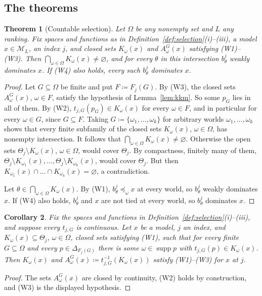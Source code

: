 \documentclass[11pt]{article}
\newtheorem{theorem}{Theorem}[section]
\newtheorem{corollary}[theorem]{Corollary}
\theoremstyle{definition}
\theoremstyle{remark}
\newcommand{\M}{\mathcal M}
\newcommand{\supp}{\operatorname{supp}}
\begin{document}
\subsection{The theorems}

\begin{theorem}[Countable selection]\label{thm:general}
Let $\Omega$ be any nonempty set and $L$ any ranking. Fix spaces and functions as in Definition~\ref{def:selection}(i)--(iii), a model $x\in\M_L$, an index $j$, and closed sets $K_\omega(x)$ and $A^G_\omega(x)$ satisfying (W1)--(W3). Then $\bigcap_{\omega\in\Omega}K_\omega(x)\ne\varnothing$, and for every $\theta$ in this intersection $b^j_\theta$ weakly dominates $x$. If (W4) also holds, every such $b^j_\theta$ dominates $x$.
\end{theorem}
\begin{proof}
Let $G\subseteq\Omega$ be finite and put $F\coloneqq F_j(G)$. By (W3), the closed sets $A^G_\omega(x)$, $\omega\in F$, satisfy the hypothesis of Lemma~\ref{lem:kkm}. So some $p_G$ lies in all of them. By (W2), $t_{j,G}(p_G)\in K_\omega(x)$ for every $\omega\in F$, and in particular for every $\omega\in G$, since $G\subseteq F$. Taking $G\coloneqq\{\omega_1,\dots,\omega_k\}$ for arbitrary worlds $\omega_1,\dots,\omega_k$ shows that every finite subfamily of the closed sets $K_\omega(x)$, $\omega\in\Omega$, has nonempty intersection. It follows that $\bigcap_{\omega\in\Omega}K_\omega(x)\ne\varnothing$. Otherwise the open sets $\Theta_j\setminus K_\omega(x)$, $\omega\in\Omega$, would cover $\Theta_j$. By compactness, finitely many of them, $\Theta_j\setminus K_{\omega_1}(x),\dots,\Theta_j\setminus K_{\omega_k}(x)$, would cover $\Theta_j$. But then $K_{\omega_1}(x)\cap\dots\cap K_{\omega_k}(x)=\varnothing$, a contradiction.

Let $\theta\in\bigcap_{\omega\in\Omega}K_\omega(x)$. By (W1), $b^j_\theta\preceq_\omega x$ at every world, so $b^j_\theta$ weakly dominates $x$. If (W4) also holds, $b^j_\theta$ and $x$ are not tied at every world, so $b^j_\theta$ dominates $x$.
\end{proof}

\begin{corollary}\label{cor:inverse}
Fix the spaces and functions in Definition~\ref{def:selection}(i)--(iii), and suppose every $t_{j,G}$ is continuous. Let $x$ be a model, $j$ an index, and $K_\omega(x)\subseteq\Theta_j$, $\omega\in\Omega$, closed sets satisfying (W1), such that for every finite $G\subseteq\Omega$ and every $p\in\Delta_{F_j(G)}$ there is some $\omega\in\supp p$ with $t_{j,G}(p)\in K_\omega(x)$. Then $K_\omega(x)$ and $A^G_\omega(x)\coloneqq t_{j,G}^{-1}(K_\omega(x))$ satisfy (W1)--(W3) for $x$ at $j$.
\end{corollary}
\begin{proof}
The sets $A^G_\omega(x)$ are closed by continuity, (W2) holds by construction, and (W3) is the displayed hypothesis.
\end{proof}
\end{document}
